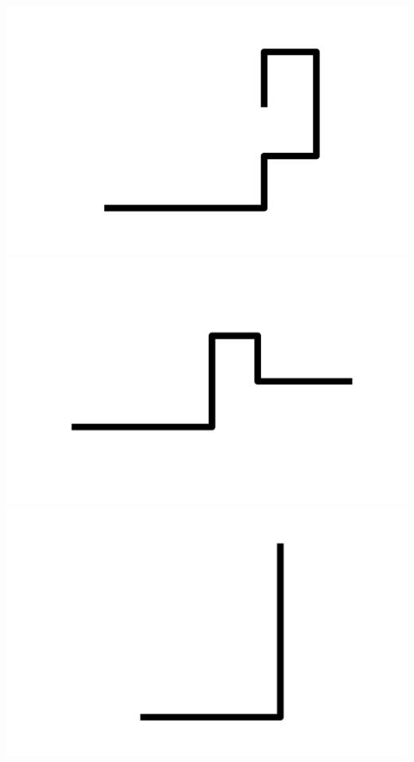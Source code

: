 \documentclass[]{report}
\begin{document}
\includegraphics[scale=.1]{pictures/21/state_cluster_shapes_121.pdf} 
\includegraphics[scale=.1]{pictures/21/state_cluster_shapes_122.pdf} 
\includegraphics[scale=.1]{pictures/21/state_cluster_shapes_123.pdf} 
\end{document}
